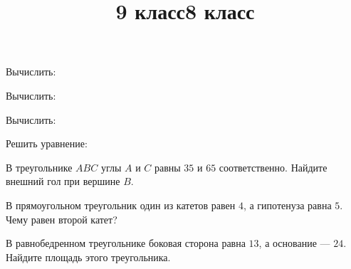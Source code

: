 \newpage
\title{9 класс}
\begin{listofex}
	\item Вычислить:
	\begin{enumcols}[itemcolumns=3]
		\item {}
		\item {}
		\item {}
		\item {}
	\end{enumcols}
	\item Вычислить:
	\begin{enumcols}[itemcolumns=3]
		\item {}
		\item {}
		\item {}
		\item {}
		\item {}
	\end{enumcols}
	\item Вычислить:
	\begin{enumcols}[itemcolumns=2]
		\item {}
		\item {}
	\end{enumcols}
	\item Решить уравнение:
	\begin{enumcols}[itemcolumns=3]
		\item {}
		\item {}
		\item {}
	\end{enumcols}
	\item В треугольнике \( ABC \) углы \( A \) и \( C \) равны \( 35 \) и \( 65 \) соответственно. Найдите внешний гол при вершине \( B \).
	\item В прямоугольном треугольник один из катетов равен \( 4 \), а гипотенуза равна \( 5 \). Чему равен второй катет?
	\item В равнобедренном треугольнике боковая сторона равна \( 13 \), а основание --- \( 24 \). Найдите площадь этого треугольника.
\end{listofex}
\newpage
\title{8 класс}
